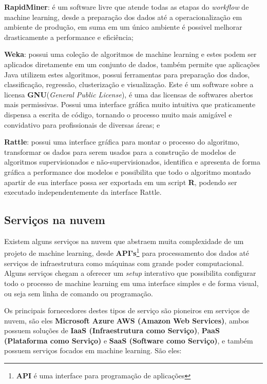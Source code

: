 \begin{alineas}
	\item \textbf{RapidMiner}: é um software livre que atende todas as etapas do \textit{workflow} de machine learning, desde a preparação dos dados até 
	a operacionalização em ambiente de produção, em suma em um único ambiente é possivel melhorar drasticamente a performance e eficiência;

	\item \textbf{Weka}: possui uma coleção de algoritmos de machine learning e estes podem ser aplicados diretamente em um conjunto de dados, também permite
	que aplicações Java utilizem estes algoritmos, possui ferramentas para preparação dos dados, classificação, regressão, clusterização e visualização.
	Este é um software sobre a licensa \textbf{GNU}(\textit{General Public License}), é uma das licensas de softwares abertos mais permissivas. 
	Possui uma interface gráfica muito intuitiva que praticamente dispensa a escrita de código, tornando o processo muito mais amigável e
	convidativo para profissionais de diversas áreas; e
	\item \textbf{Rattle}: possui uma interface gráfica para montar o processo do algoritmo, transformar os dados para serem usados para a construção 
	de modelos de algoritmos supervisionados e não-supervisionados, identifica e apresenta de forma gráfica a performance dos modelos e possibilita que
	todo o algoritmo montado apartir de sua interface possa ser exportada em um script \textbf{R}, 
	podendo ser executado independentemente da interface Rattle.
\end{alineas}


\subsection{Serviços na nuvem}
\label{subsec:servicos}
Existem alguns serviços na nuvem que abstraem muita complexidade de um projeto de machine learning, 
desde \textbf{API's}\footnote{\textbf{API} é uma interface para programação de aplicações} para processamento dos dados até serviços de infraestrutura como máquinas com grande poder computacional.
Alguns serviços chegam a oferecer um \textit{setup} interativo que possibilita configurar todo o processo de machine learning em uma interface
simples e de forma visual, ou seja sem linha de comando ou programação.


Os principais fornecedores destes tipos de serviço são pioneiros em serviços de nuvem, são eles \textbf{Microsoft Azure} \textbf{AWS (Amazon Web Services)}, 
ambos possuem soluções de \textbf{IaaS (Infraestrutura como Serviço)}, \textbf{PaaS (Plataforma como Serviço)} e \textbf{SaaS (Software como Serviço)}, e também
possuem serviços focados em machine learning. São eles:


